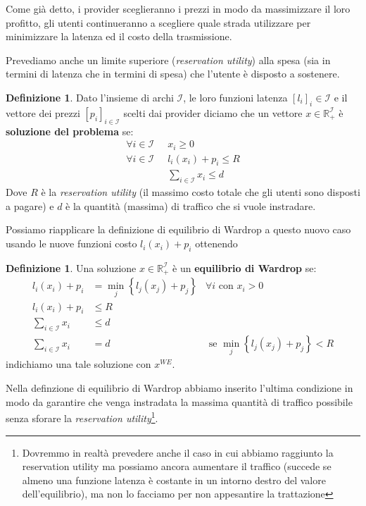 \documentclass[a4paper]{article}
\theoremstyle{plain}
\theoremstyle{definition}
\newtheorem{mydef}[myteo]{Definizione}
\theoremstyle{remark}
\newcommand{\set}[1]{\left\{#1\right\}}
\newcommand{\pa}[1]{\left(#1\right)}
\newcommand{\bra}[1]{\left[#1\right]}
\begin{document}
Come già detto, i provider sceglieranno i prezzi in modo da
massimizzare il loro profitto, gli utenti continueranno a scegliere
quale strada utilizzare per minimizzare la latenza ed il costo della
trasmissione.

Prevediamo anche un limite superiore (\textit{reservation utility})
alla spesa (sia in termini di latenza che in termini di spesa) che
l'utente è disposto a sostenere.

\begin{mydef}
  Dato l'insieme di archi $\mathcal{I}$, le loro funzioni
  latenza $\bra{l_i}_i\in\mathcal{I}$ e il vettore dei prezzi
  $\bra{p_i}_{i\in\mathcal{I}}$ scelti dai provider diciamo che un
  vettore $x\in \mathbb{R}_+^\mathcal{I}$ è \textbf{soluzione del
    problema} se:
  \begin{align*}
    \forall i\in \mathcal{I}\;\; & x_i \ge 0 \\
    \forall i\in \mathcal{I}\;\; & l_i(x_i) + p_i \le R \\
    & \sum _{i\in \mathcal{I}} x_i \le d 
  \end{align*}
  Dove $R$ è la \textit{reservation utility} (il massimo costo totale
  che gli utenti sono disposti a pagare) e $d$ è la quantità (massima)
  di traffico che si vuole instradare.
\end{mydef}

Possiamo riapplicare la definizione di equilibrio di Wardrop a questo
nuovo caso usando le nuove funzioni costo $l_i\pa{x_i} + p_i$ ottenendo

\begin{mydef}
  Una soluzione $x\in \mathbb{R}_+^\mathcal{I}$ è un
  \textbf{equilibrio di Wardrop} se:
  \begin{align*}
    l_i(x_i) + p_i &= \min _j \set{l_j(x_j)+p_j} & \forall i\text{ con } x_i>0 \\
    l_i(x_i) + p_i &\le R \\
    \sum _{i\in \mathcal{I}} x_i &\le d \\
    \sum _{i\in \mathcal{I}} x_i &= d & \text { se } \min _j
                                        \set{l_j(x_j)+p_j} <R
  \end{align*}
  indichiamo una tale soluzione con $x^{WE}$.
\end{mydef}

Nella definzione di equilibrio di Wardrop abbiamo inserito l'ultima
condizione in modo da garantire che venga instradata la massima
quantità di traffico possibile senza sforare la \textit{reservation
  utility}\footnote{Dovremmo in realtà prevedere anche il caso in cui
  abbiamo raggiunto la reservation utility ma possiamo ancora
  aumentare il traffico (succede se almeno una funzione latenza è
  costante in un intorno destro del valore dell'equilibrio), ma non lo
  facciamo per non appesantire la trattazione}.
\end{document}
